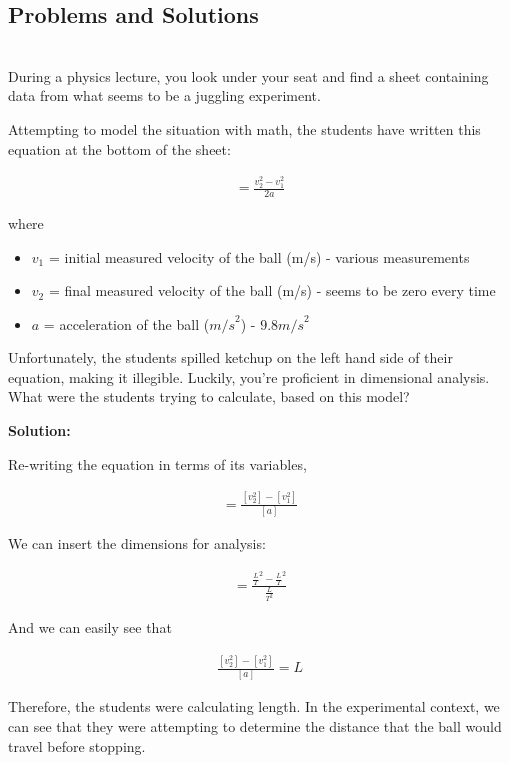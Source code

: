 \subsection{Problems and Solutions}
 \vspace{0.25cm}
\begin{problem}\\ During a physics lecture, you look under your seat and find a sheet containing data from what seems to be a juggling experiment.

Attempting to model the situation with math, the students have written this equation at the bottom of the sheet: 

\begin{align*}
=\frac{v_2^{2}-v_1^{2}}{2a}
\end{align*}

where 
\begin{itemize}
\item $v_1$ = initial measured velocity of the ball (m/s) - various measurements
\item $v_2$ = final measured velocity of the ball (m/s) - seems to be zero every time 
\item $a$ = acceleration of the ball (${m/s}^{2}$) - $9.8 {m/s}^{2}$
\end{itemize}

Unfortunately, the students spilled ketchup on the left hand side of their equation, making it illegible. Luckily, you're proficient in dimensional analysis. What were the students trying to calculate, based on this model?

\textbf{Solution:}

Re-writing the equation in terms of its variables,

\begin{align*}
=\frac{[v_2^{2}]-[v_1^{2}]}{[a]}
\end{align*}

We can insert the dimensions for analysis:

\begin{align*}
=\frac{\frac{L}{T}^{2}-\frac{L}{T}^{2}}{\frac{L}{T^{2}}}
\end{align*}

And we can easily see that 

\begin{align*}
\frac{[v_2^{2}]-[v_1^{2}]}{[a]} = L
\end{align*}

Therefore, the students were calculating length. In the experimental context, we can see that they were attempting to determine the distance that the ball would travel before stopping.\end{problem}

